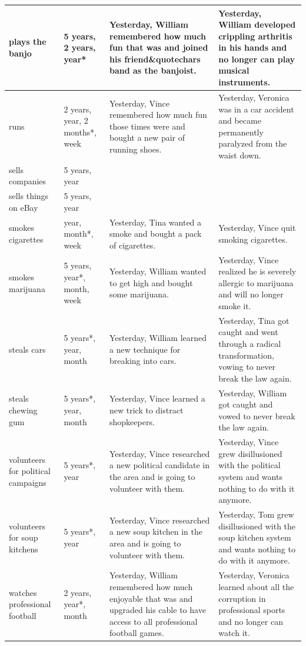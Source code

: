 \documentclass[english,,man,floatsintext]{apa6}
\theoremstyle{definition}
\theoremstyle{definition}
\theoremstyle{definition}
\theoremstyle{remark}
\begin{document}
\begin{longtable}{ |p{1in}|p{1.2in}| p{1.75in}|p{1.75in} |}
   \hline
plays the banjo & 5 years, 2 years, year* & Yesterday, William remembered how much fun that was and joined his friend\&quotechars band as the banjoist. & Yesterday, William developed crippling arthritis in his hands and no longer can play musical instruments. \\ 
   \hline
runs & 2 years, year, 2 months*, week & Yesterday, Vince remembered how much fun those times were and bought a new pair of running shoes. & Yesterday, Veronica was in a car accident and became permanently paralyzed from the waist down. \\ 
   \hline
sells companies & 5 years, year &  &  \\ 
   \hline
sells things on eBay & 5 years, year &  &  \\ 
   \hline
smokes cigarettes & year, month*, week & Yesterday, Tina wanted a smoke and bought a pack of cigarettes. & Yesterday, Vince quit smoking cigarettes. \\ 
   \hline
smokes marijuana & 5 years, year*, month, week & Yesterday, William wanted to get high and bought some marijuana. & Yesterday, Vince realized he is severely allergic to marijuana and will no longer smoke it. \\ 
   \hline
steals cars & 5 years*, year, month & Yesterday, William learned a new technique for breaking into cars. & Yesterday, Tina got caught and went through a radical transformation, vowing to never break the law again. \\ 
   \hline
steals chewing gum & 5 years*, year, month & Yesterday, Vince learned a new trick to distract shopkeepers. & Yesterday, William got caught and vowed to never break the law again. \\ 
   \hline
volunteers for political campaigns & 5 years*, year & Yesterday, Vince researched a new political candidate in the area and is going to volunteer with them. & Yesterday, Vince grew disillusioned with the political system and wants nothing to do with it anymore. \\ 
   \hline
volunteers for soup kitchens & 5 years*, year & Yesterday, Vince researched a new soup kitchen in the area and is going to volunteer with them. & Yesterday, Tom grew disillusioned with the soup kitchen system and wants nothing to do with it anymore. \\ 
   \hline
watches professional football & 2 years, year*, month & Yesterday, William remembered how much enjoyable that was and upgraded his cable to have access to all professional football games. & Yesterday, Veronica learned about all the corruption in professional sports and no longer can watch it. \\ 

\end{longtable}
\end{document}
